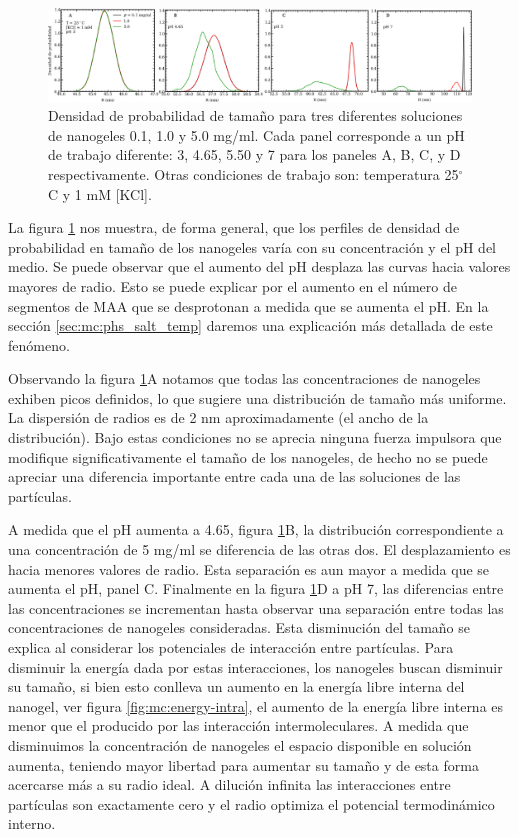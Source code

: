 	\begin{figure}
		\centering
		\includegraphics[width=0.99\linewidth]{Figures/graph-mc/sizes-phs.pdf}
		\caption{Densidad de probabilidad de tama\~no para tres diferentes soluciones de nanogeles 0.1, 1.0 y 5.0 mg/ml. Cada panel corresponde a un pH de trabajo diferente: 3, 4.65, 5.50 y 7 para los paneles A, B, C, y D respectivamente. Otras condiciones de trabajo son: temperatura 25$^\circ$C y 1 mM  [KCl].}
		\label{fig:mc:densidad-probabilidad}
	\end{figure}
	
	La figura \ref{fig:mc:densidad-probabilidad} nos muestra, de forma general, que los perfiles de densidad de probabilidad en tama\~no de los nanogeles var\'ia con su concentraci\'on y el pH del medio. Se puede observar que el aumento del pH desplaza las curvas hacia valores mayores de radio. Esto se puede explicar por el aumento en el n\'umero de segmentos de MAA que se desprotonan a medida que se aumenta el pH. En la secci\'on \ref{sec:mc:phs_salt_temp} daremos una explicaci\'on m\'as detallada de este fen\'omeno.
	
	Observando la figura \ref{fig:mc:densidad-probabilidad}A notamos que todas las concentraciones de nanogeles exhiben picos definidos, lo que sugiere una distribuci\'on de tama\~no m\'as uniforme. La dispersi\'on de radios es de 2 nm aproximadamente (el ancho de la distribuci\'on). Bajo estas condiciones no se aprecia ninguna fuerza impulsora que modifique significativamente el tama\~no de los nanogeles, de hecho no se puede apreciar una diferencia importante entre cada una de las soluciones de las part\'iculas.
	
	A medida que el pH aumenta a 4.65, figura \ref{fig:mc:densidad-probabilidad}B, la distribuci\'on correspondiente a una concentraci\'on de 5 mg/ml se diferencia de las otras dos. El desplazamiento es hacia menores valores de radio. Esta separaci\'on es aun mayor a medida que se aumenta el pH, panel C. Finalmente en la figura \ref{fig:mc:densidad-probabilidad}D a pH 7, las diferencias entre las concentraciones se incrementan hasta observar una separaci\'on entre todas las concentraciones de nanogeles consideradas. Esta disminuci\'on del tama\~no se explica al considerar los potenciales de interacci\'on entre part\'iculas. Para disminuir la energ\'ia dada por estas interacciones, los nanogeles buscan disminuir su tama\~no, si bien esto conlleva un aumento en la energ\'ia libre interna del nanogel, ver figura \ref{fig:mc:energy-intra}, el aumento de la energ\'ia libre interna es menor que el producido por las interacci\'on intermoleculares. A medida que disminuimos la concentraci\'on de nanogeles el espacio disponible en soluci\'on aumenta, teniendo mayor libertad para  aumentar su tama\~no y de esta forma acercarse m\'as a su radio ideal. A  diluci\'on infinita las  interacciones entre part\'iculas son exactamente cero y el radio optimiza el potencial termodin\'amico interno. 
	
